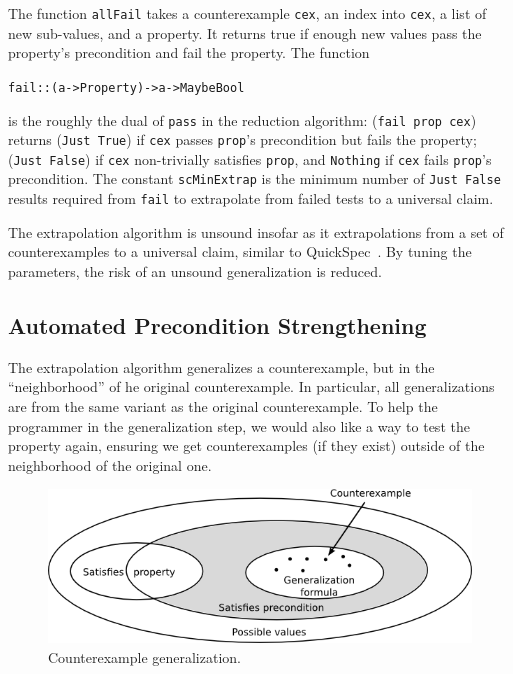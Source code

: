 \documentclass[10pt]{sigplanconf}
\newenvironment{code}{\begin{alltt}}{\end{alltt}}
\newcommand{\ttp}[1]{\texttt{#1}}
\begin{document}
The function \ttp{allFail} takes a counterexample \ttp{cex}, an index into
\ttp{cex}, a list of new sub-values, and a property.  It returns true if enough
new values pass the property's precondition and fail the property.  The function
%
\begin{code}
fail :: (a -> Property) -> a -> Maybe Bool
\end{code}
%
\noindent
is the roughly the dual of \ttp{pass} in the reduction algorithm: (\ttp{fail
  prop cex}) returns (\ttp{Just True}) if \ttp{cex} passes \ttp{prop}'s
precondition but fails the property; (\ttp{Just False}) if \ttp{cex}
non-trivially satisfies \ttp{prop}, and \ttp{Nothing} if \ttp{cex} fails
\ttp{prop}'s precondition.  The constant \ttp{scMinExtrap} is the minimum number
of \ttp{Just False} results required from \ttp{fail} to extrapolate from failed
tests to a universal claim.

The extrapolation algorithm is unsound insofar as it extrapolations from a set
of counterexamples to a universal claim, similar to QuickSpec~\cite{qs}.  By
tuning the parameters, the risk of an unsound generalization is reduced.

\subsection{Automated Precondition Strengthening}\label{sec:precondition}
The extrapolation algorithm generalizes a counterexample, but in the
``neighborhood'' of he original counterexample.  In particular, all
generalizations are from the same variant as the original counterexample.  To
help the programmer in the generalization step, we would also like a way to test
the property again, ensuring we get counterexamples (if they exist) outside of
the neighborhood of the original one.

\begin{figure}[ht!]
  \begin{center}
    \includegraphics[scale=0.5]{Figs/cex-gen}
   \end{center}
  \caption{Counterexample generalization.}
  \label{fig:cex-gen}
\end{figure}
\end{document}
